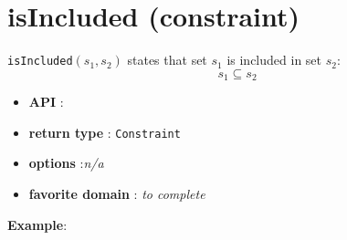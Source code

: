 \label{isincluded}
\hypertarget{isincluded}{}

\section{isIncluded (constraint)}\label{isincluded:isincludedconstraint}\hypertarget{isincluded:isincludedconstraint}{}
\begin{notedef}
  \texttt{isIncluded}$(s_1,s_2)$ states that set $s_1$ is included in set $s_2$:
 $$s_1\subseteq s_2$$
\end{notedef}

\begin{itemize}
	\item \textbf{API} : 
	\item \textbf{return type} : \texttt{Constraint}
	\item \textbf{options} :\emph{n/a}
	\item \textbf{favorite domain} : \emph{to complete}
\end{itemize}

\textbf{Example}:

